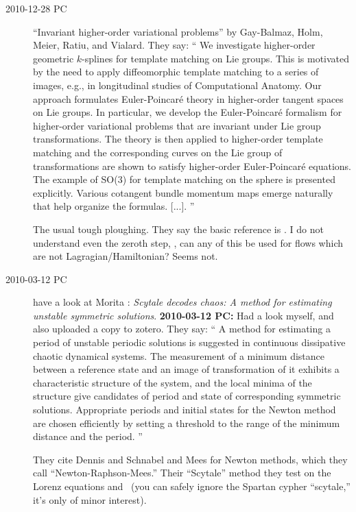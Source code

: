 \begin{description}
\item[2010-12-28 PC]
{``Invariant higher-order variational problems''}
by Gay-Balmaz, Holm, Meier,  Ratiu, and Vialard. They say: ``
We investigate higher-order geometric $k$-splines for template matching
on Lie groups. This is motivated by the need to apply diffeomorphic
template matching to a series of images, e.g., in longitudinal studies of
Computational Anatomy. Our approach formulates Euler-Poincar\'e theory in
higher-order tangent spaces on Lie groups. In particular, we develop the
Euler-Poincar\'e formalism for higher-order variational problems that are
invariant under Lie group transformations. The theory is then applied to
higher-order template matching and the corresponding curves on the Lie
group of transformations are shown to satisfy higher-order
Euler-Poincar\'{e} equations. The example of SO(3) for template matching
on the sphere is presented explicitly. Various cotangent bundle momentum
maps emerge naturally that help organize the formulas. [...].
''

The usual tough ploughing. They say the basic reference is .
I do not understand even the zeroth step, \ie, can any of this be used for
flows which are not Lagragian/Hamiltonian? Seems not.

\item[2010-03-12 PC] have a look at Morita \etal{}:
    {\em Scytale decodes chaos: {A} method for estimating
    unstable symmetric solutions}.
{\bf 2010-03-12 PC:} Had a look myself, and also uploaded a copy to
{zotero}. They say: ``
A method for estimating a period of unstable periodic solutions
is suggested in continuous dissipative chaotic dynamical
systems. The measurement of a minimum distance between a
reference state and an image of transformation of it exhibits a
characteristic structure of the system, and the local minima of
the structure give candidates of period and state of
corresponding symmetric solutions. Appropriate periods and
initial states for the Newton method are chosen efficiently by
setting a threshold to the range of the minimum distance and
the period.
	''

											\toCB
They cite Dennis and Schnabel and Mees for Newton
methods, which they call ``Newton-Raphson-Mees.'' Their ``Scytale''
method they test on the Lorenz equations and \KSe\ (you can safely ignore
the Spartan cypher  ``scytale,'' it's only of minor interest).


\end{description}

